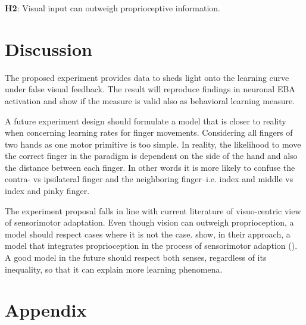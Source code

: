 \documentclass[man]{apa7}
\begin{document}
\textbf{H2}: Visual input can outweigh proprioceptive information.

\section{Discussion}

The proposed experiment provides data to sheds light onto the learning curve under false visual feedback. The result will reproduce findings in neuronal EBA activation and show if the measure is valid also as behavioral learning measure.

A future experiment design should formulate a model that is closer to reality when concerning learning rates for finger movements. Considering all fingers of two hands as one motor primitive is too simple. In reality, the likelihood to move the correct finger in the paradigm is dependent on the side of the hand and also the distance between each finger. In other words it is more likely to confuse the contra- vs ipsilateral finger and the neighboring finger–i.e. index and middle vs index and pinky finger.

The experiment proposal falls in line with current literature of visuo-centric view of sensorimotor adaptation. Even though vision can outweigh proprioception, a model should respect cases where it is not the case. \citeauthor{Tsay2022} show, in their approach, a model that integrates proprioception in the process of sensorimotor adaption (\citeyear{Tsay2022}). A good model in the future should respect both senses, regardless of its inequality, so that it can explain more learning phenomena.

\printbibliography
\newpage

\section{Appendix}
\end{document}
